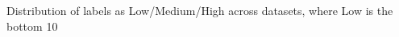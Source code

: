 \documentclass[preview]{standalone}
\begin{document}
Distribution of labels as Low/Medium/High across datasets, where Low is the bottom 10%
\end{document}
